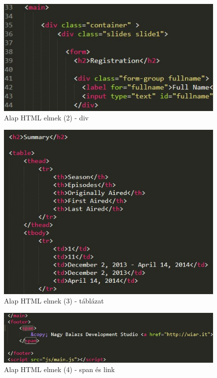 \documentclass[12pt, titlepage]{article}
\begin{document}
\pagebreak

\begin{figure}[!h]
	\centering
	\includegraphics[width=0.9\linewidth]{images/html/2.jpg}
	\caption{Alap HTML elmek (2) - div}
\end{figure}

\begin{figure}[!h]
	\centering
	\includegraphics[width=0.9\linewidth]{images/html/4.jpg}
	\caption{Alap HTML elmek (3) - táblázat}
\end{figure}

\begin{figure}[!h]
	\centering
	\includegraphics[width=0.8\linewidth]{images/html/3.jpg}
	\caption{Alap HTML elmek (4) - span és link}
\end{figure}
\end{document}
